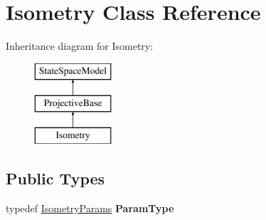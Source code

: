 \hypertarget{classIsometry}{\section{Isometry Class Reference}
\label{classIsometry}
}
Inheritance diagram for Isometry\-:\begin{figure}[H]
\begin{center}
\leavevmode
\includegraphics[height=3.000000cm]{classIsometry}
\end{center}
\end{figure}
\subsection*{Public Types}
\begin{DoxyCompactItemize}
\item 
\hypertarget{classIsometry_a51e8c76cfd23beaf824f89628c6397a0}{typedef \hyperlink{structIsometryParams}{Isometry\-Params} {\bfseries Param\-Type}}\label{classIsometry_a51e8c76cfd23beaf824f89628c6397a0}

\end{DoxyCompactItemize}
